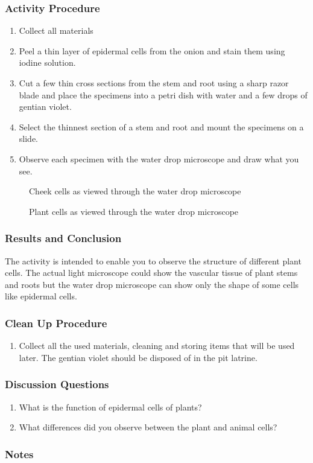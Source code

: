 \subsubsection*{Activity Procedure}
\begin{enumerate}
\item{Collect all materials}
\item{Peel a thin layer of epidermal cells from the onion and stain them using iodine solution.}
\item{Cut a few thin cross sections from the stem and root using a sharp razor blade and place the specimens into a petri dish with water and a few drops of gentian violet.}
\item{Select the thinnest section of a stem and root and mount the specimens on a slide.}
\item{Observe each specimen with the water drop microscope and draw what you see.}
\end{enumerate}

\begin{figure}[h]
\begin{center}
\def\svgwidth{6cm}

\caption{Cheek cells as viewed through the water drop microscope}
\label{fig:cheek}
\end{center}
\end{figure}

\begin{figure}[h]
\begin{center}
\def\svgwidth{6cm}

\caption{Plant cells as viewed through the water drop microscope}
\label{fig:plantcell}
\end{center}
\end{figure}

\subsubsection*{Results and Conclusion}
The activity is intended to enable you to observe the structure of different plant cells. The actual light microscope could show the vascular tissue of plant stems and roots but the water drop microscope can show only the shape of some cells like epidermal cells.

\subsubsection*{Clean Up Procedure}
\begin{enumerate}
\item{Collect all the used materials, cleaning and storing items that will be used later. The gentian violet should be disposed of in the pit latrine.}
\end{enumerate}

\subsubsection*{Discussion Questions}
\begin{enumerate}
\item{What is the function of epidermal cells of plants?}
\item{What differences did you observe between the plant and animal cells?}
\end{enumerate}

\subsubsection*{Notes}